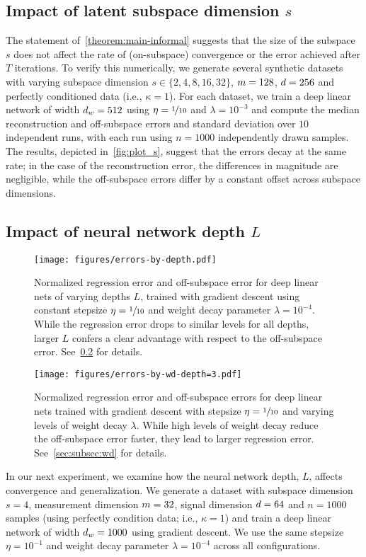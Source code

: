 \subsection{Impact of latent subspace dimension $s$} \label{sec:impact of s}
The statement of~\cref{theorem:main-informal} suggests that the size of
the subspace $s$ does not affect the rate of (on-subspace) convergence
or the error achieved after $T$ iterations. To verify this numerically,
we generate several synthetic datasets with varying subspace dimension
$s \in \{2, 4, 8, 16, 32\}$, $m = 128$, $d = 256$ and perfectly conditioned data (i.e., $\kappa = 1$). For each dataset, we train a deep linear network of width $d_{w} = 512$ using $\eta = \nicefrac{1}{10}$ and $\lambda = 10^{-3}$ and compute the median reconstruction and off-subspace errors and standard deviation over $10$ independent runs, with each run using $n = 1000$ independently drawn samples. The results, depicted in~\cref{fig:plot_s},
suggest that the errors decay at the same rate; in the case of
the reconstruction error, the differences in magnitude are
negligible, while the off-subspace errors differ by a constant offset across subspace dimensions.

\subsection{Impact of neural network depth $L$}
\label{sec:subsec:depth}
\begin{figure*}[!h]
    \centering
    \texttt{[image: figures/errors-by-depth.pdf]}
    \caption{Normalized regression error and off-subspace error for deep linear nets of varying
    depths $L$, trained with gradient descent using
    constant stepsize $\eta = \sfrac{1}{10}$ and weight decay parameter $\lambda = 10^{-4}$. While
    the regression error drops to similar levels for
    all depths, larger $L$ confers a clear advantage with respect to the off-subspace error. See~\cref{sec:subsec:depth} for details.}
    \label{fig:errors-by-depth}
\end{figure*}
\begin{figure}[!h]
    \centering
    \texttt{[image: figures/errors-by-wd-depth=3.pdf]}
    \caption{Normalized regression error and off-subspace errors for deep linear nets trained with
    gradient descent with stepsize $\eta = \sfrac{1}{10}$ and varying levels of weight decay $\lambda$. While high levels of weight decay reduce
    the off-subspace error faster, they lead to
    larger regression error. See~\cref{sec:subsec:wd} for details.}
     \label{fig:wd}
\end{figure}
In our next experiment, we examine how the neural network depth, $L$, affects convergence and generalization. We generate a dataset with subspace dimension $s = 4$,
measurement dimension $m = 32$, signal dimension $d = 64$ and $n = 1000$ samples (using perfectly condition data; i.e., $\kappa = 1$) and train a deep linear network of width $d_{w} = 1000$ using
gradient descent. We use the same stepsize $\eta = 10^{-1}$ and weight
decay parameter $\lambda = 10^{-4}$ across all configurations.

